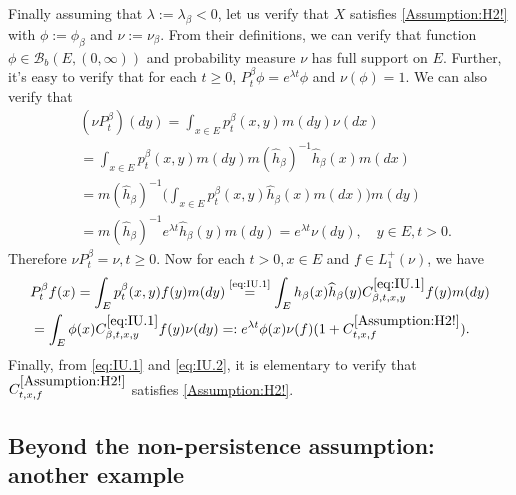 \documentclass[12pt,a4paper]{amsart}
\numberwithin{equation}{section}
\theoremstyle{plain}
\theoremstyle{definition}
\theoremstyle{remark}
\newcounter{N}
\newcounter{n}[N]
\begin{document}
Finally assuming that $\lambda := \lambda_\beta < 0$, let us verify that $X$ satisfies \ref{Assumption:H2!} with $\phi:=\phi_\beta$ and $\nu:= \nu_\beta$.
From their definitions, we can verify that function $\phi \in \mathcal B_b(E,(0,\infty))$ and probability measure $\nu$ has full support on $E$. 
Further, it's easy to verify that for each $t\geq 0$, $P_t^\beta \phi = e^{\lambda t}\phi$ and $\nu(\phi) = 1$.
We can also verify that
\begin{align}
&(\nu P_t^\beta)(dy) = \int_{x\in E}p_{t}^\beta(x,y)m(dy) \nu(dx) 
\\&= \int_{x\in E}p_{t}^\beta(x,y)m(dy) m(\widehat h_\beta)^{-1}\widehat h_\beta(x)m(dx)
\\&=  m(\widehat h_\beta)^{-1}  \Big(\int_{x\in E} p_t^\beta(x,y) \widehat h_\beta(x) m(dx) \Big) m(dy)
\\& = m(\widehat h_\beta)^{-1} e^{\lambda t}\widehat h_\beta(y) m(dy) = e^{\lambda t}\nu(dy), \quad y \in E, t>0.
\end{align}
Therefore $\nu P_t^\beta = \nu, t\geq 0$. Now for each $t>0, x \in E$ and $f\in L_1^+(\nu)$, we have
\begin{align} 
&P_t^\beta f(x) = \int_{E} p^\beta_t(x,y) f(y)m(dy)
\overset{\text{\eqref{eq:IU.1}}}= \int_{E} h_\beta (x) \widehat h_\beta (y) C^{\eqref{eq:IU.1}}_{\beta,t,x,y} f(y) m(dy)
\\&= \int_{E} \phi (x)  C^{\eqref{eq:IU.1}}_{\beta,t,x,y} f(y) \nu(dy)
=: e^{\lambda t} \phi(x) \nu(f) (1+ C^{\ref{Assumption:H2!}}_{t,x,f}).
 \end{align}
Finally, from \eqref{eq:IU.1} and \eqref{eq:IU.2}, it is elementary to verify that $C^{\ref{Assumption:H2!}}_{t,x,f}$ satisfies \ref{Assumption:H2!}.
\subsection{Beyond the non-persistence assumption: another example}
\end{document}
